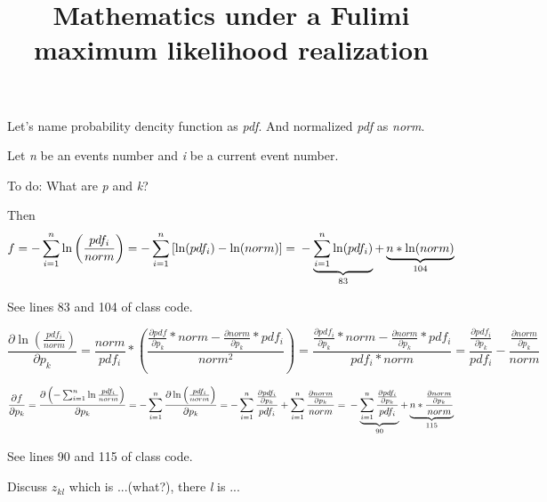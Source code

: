 \documentclass[a4paper,10pt]{article}
\title{Mathematics under a Fulimi maximum likelihood realization}
\begin{document}
\maketitle

%


Let's name probability dencity function as \textit{pdf}. And normalized \textit{pdf} as \textit{norm}.

Let \textit{n} be an events number and \textit{i} be a current event number.

To do: What are \textit{p} and \textit{k}?

Then
$$f = - \sum_{i=1}^{n}\ln \left(\frac{pdf_i}{norm} \right) = - \sum_{i=1}^{n} \left[\ln(pdf_i) - \ln(norm) \right] =\\
- \underbrace{\sum_{i=1}^{n} \ln(pdf_i)}_{83} + \underbrace{n*\ln(norm)}_{104} $$

See lines 83 and 104 of class code.

$$\frac{\partial \ln \left( \frac{pdf_i}{norm}\right)}{\partial p_k}  = \frac{norm}{pdf_i}* \left(\frac{\frac{\partial pdf}{\partial p_k}*norm - \frac{\partial norm}{\partial p_k}*pdf_i}{norm^2} \right) = \frac{\frac{\partial pdf_i}{\partial p_k}*norm - \frac{\partial norm}{\partial p_k}*pdf_i}{pdf_i*norm} = \frac{\frac{\partial pdf_i}{\partial p_k}}{pdf_i} - \frac{\frac{\partial norm}{\partial p_k}}{norm}$$

$$\frac{\partial f}{\partial p_k} = \frac{\partial \left( - \sum_{i=1}^n \ln \frac{pdf_i}{norm} \right)}{\partial p_k} = -\sum_{i=1}^n \frac{\partial \ln \left( \frac{pdf_i}{norm} \right)}{\partial p_k} = - \sum_{i=1}^n \frac{\frac{\partial pdf_i}{\partial p_k}}{pdf_i} + \sum_{i=1}^n \frac{\frac{\partial norm}{\partial p_k}}{norm} = \\
- \underbrace{\sum_{i=1}^n \frac{\frac{\partial pdf_i}{\partial p_k}}{pdf_i}}_{90} + \underbrace{n* \frac{\frac{\partial norm}{\partial p_k}}{norm}}_{115} $$

See lines 90 and 115 of class code.

Discuss $z_{kl}$ which is ...(what?), there \textit{l} is ...
\end{document}

